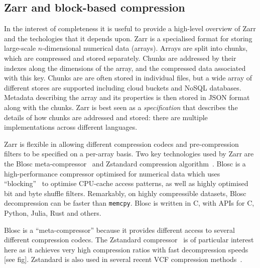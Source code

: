 \documentclass[a4paper,num-refs]{oup-contemporary}
\begin{document}
\subsection{Zarr and block-based compression}
In the interest of completeness it is useful to provide a high-level overview
of Zarr and the techologies that it depends upon. Zarr is a specialised format
for storing large-scale $n$-dimensional numerical data (arrays). Arrays
are split into chunks, which are compressed and stored separately. Chunks are 
addressed by their indexes along the dimensions of the array, and the 
compressed data associated with this key. Chunks are
are often stored in individual files, but a wide array of different
stores are supported including cloud buckets and NoSQL databases. 
Metadata describing the array and its properties is then stored 
in JSON format along with the chunks. Zarr is best seen as a 
\emph{specification} that describes the details of how chunks are 
addressed and stored: there are multiple implementations across
different languages.

Zarr is flexible in allowing different compression codecs and 
pre-compression filters to be specified on a per-array basis.
Two key technologies used by Zarr are the Blosc
meta-compressor~\cite{alted2010modern}
and Zstandard compression algorithm~\citep{collet2021rfc}.
Blosc is a high-performance compressor optimised for numerical
data which uses ``blocking''~\citep{alted2010modern} to 
optimise CPU-cache access patterns, as well as highly optimised
bit and byte shuffle filters.  Remarkably, on highly 
compressible datasets, Blosc decompression can be faster 
than \texttt{memcpy}.
Blosc is written in C, with APIs for C, Python, Julia, Rust
and others.

Blosc is a ``meta-compressor'' because it provides different 
access to several different compression codecs. The 
Zstandard compressor~\citep{collet2021rfc} is of particular 
interest here as it achieves very high compression ratios
with fast decompression speeds [see fig]. 
Zstandard is also used in several recent VCF compression 
methods~\citep[e.g.][]{lefaive2021sparse,wertenbroek2022xsi}.

\end{document}
